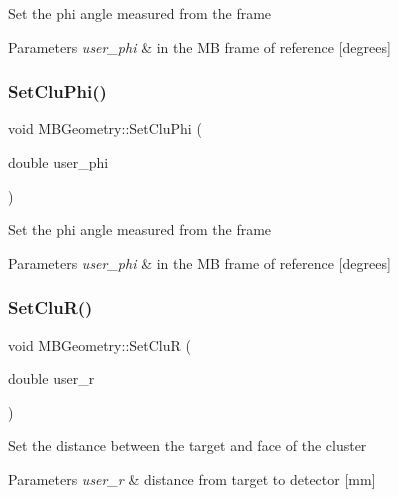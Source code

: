 Set the phi angle measured from the frame 
\begin{DoxyParams}{Parameters}
{\em user\+\_\+phi} & in the MB frame of reference \mbox{[}degrees\mbox{]} \\
\hline
\end{DoxyParams}
\mbox{\label{class_m_b_geometry_a74142f84cf6317d52ae39c0e0ff8a87e}} 
\subsubsection{\texorpdfstring{Set\+Clu\+Phi()}{SetCluPhi()}\hspace{0.1cm}{\footnotesize\ttfamily [2/2]}}
{\footnotesize\ttfamily void M\+B\+Geometry\+::\+Set\+Clu\+Phi (\begin{DoxyParamCaption}\item[{double}]{user\+\_\+phi }\end{DoxyParamCaption})}

Set the phi angle measured from the frame 
\begin{DoxyParams}{Parameters}
{\em user\+\_\+phi} & in the MB frame of reference \mbox{[}degrees\mbox{]} \\
\hline
\end{DoxyParams}
\mbox{\label{class_m_b_geometry_a292c4326421c78871667e91c3694ae35}} 
\subsubsection{\texorpdfstring{Set\+Clu\+R()}{SetCluR()}\hspace{0.1cm}{\footnotesize\ttfamily [1/2]}}
{\footnotesize\ttfamily void M\+B\+Geometry\+::\+Set\+CluR (\begin{DoxyParamCaption}\item[{double}]{user\+\_\+r }\end{DoxyParamCaption})}

Set the distance between the target and face of the cluster 
\begin{DoxyParams}{Parameters}
{\em user\+\_\+r} & distance from target to detector \mbox{[}mm\mbox{]} \\
\hline
\end{DoxyParams}
\mbox{\label{class_m_b_geometry_a292c4326421c78871667e91c3694ae35}} 
